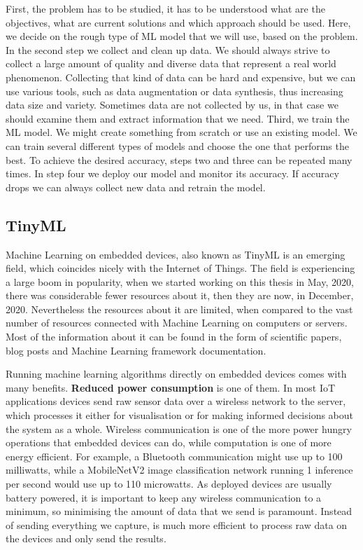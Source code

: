 First, the problem has to be studied, it has to be understood what are the objectives, what are current solutions and which approach should be used. 
Here, we decide on the rough type of ML model that we will use, based on the problem.
In the second step we collect and clean up data.
We should always strive to collect a large amount of quality and diverse data that represent a real world phenomenon.
Collecting that kind of data can be hard and expensive, but we can use various tools, such as data augmentation or data synthesis, thus increasing data size and variety.
Sometimes data are not collected by us, in that case we should examine them and extract information that we need.
Third, we train the ML model.
We might create something from scratch or use an existing model. 
We can train several different types of models and choose the one that performs the best.
To achieve the desired accuracy, steps two and three can be repeated many times.
In step four we deploy our model and monitor its accuracy. 
If accuracy drops we can always collect new data and retrain the model.


\subsection{ TinyML} \label{ml_on_embedded}

Machine Learning on embedded devices, also known as TinyML is an emerging field, which coincides nicely with the Internet of Things.
The field is experiencing a large boom in popularity, when we started working on this thesis in May, 2020, there was considerable fewer resources about it, then they are now, in December, 2020.
Nevertheless the resources about it are limited, when compared to the vast number of resources connected with Machine Learning on computers or servers.
Most of the information about it can be found in the form of scientific papers, blog posts and Machine Learning framework documentation\cite{hello_edge}\cite{tflite_risc-v}\cite{pete_tiny}\cite{daniel_edgeimpulse}\cite{eon}.

Running machine learning algorithms directly on embedded devices comes with many benefits.
\textbf{Reduced power consumption} is one of them.
In most IoT applications devices send raw sensor data over a wireless network to the server, which processes it either for visualisation or for making informed decisions about the system as a whole. 
Wireless communication is one of the more power hungry operations that embedded devices can do, while computation is one of more energy efficient\cite{pete_tiny}.
For example, a Bluetooth communication might use up to 100 milliwatts, while a MobileNetV2 image classification network running 1 inference per second would use up to 110 microwatts\cite{pete_tiny}.
As deployed devices are usually battery powered, it is important to keep any wireless communication to a minimum, so minimising the amount of data that we send is paramount.
Instead of sending everything we capture, is much more efficient to process raw data on the devices and only send the results.

